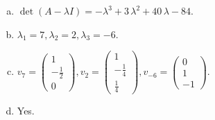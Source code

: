 \begin{questions}
\begin{solution}
\begin{enumerate}[(a)]
\item $\det(A-\lambda I)=-{\lambda}^{3} + 3 \, {\lambda}^{2} + 40 \, {\lambda} - 84$.
\item ${\lambda}_1=7, {\lambda}_2=2, {\lambda}_3=-6$.
\item $v_{7}=\left(\begin{array}{r}
1 \\
-\frac{1}{2} \\
0
\end{array}\right), v_{2}=\left(\begin{array}{r}
1 \\
-\frac{1}{4} \\
\frac{1}{4}
\end{array}\right), v_{-6}=\left(\begin{array}{r}
0 \\
1 \\
-1
\end{array}\right)$.
\item Yes.
\end{enumerate}
\end{solution}

\end{questions}

\newpage


\begin{center}
\end{center}

